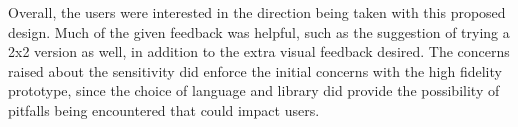 \documentclass[testing.tex]{subfiles}
\begin{document}
Overall, the users were interested in the direction being taken with this
proposed design. Much of the given feedback was helpful, such as the suggestion
of trying a 2x2 version as well, in addition to the extra visual feedback
desired. The concerns raised about the sensitivity did enforce the initial
concerns with the high fidelity prototype, since the choice of language and
library did provide the possibility of pitfalls being encountered that could
impact users.
\end{document}
